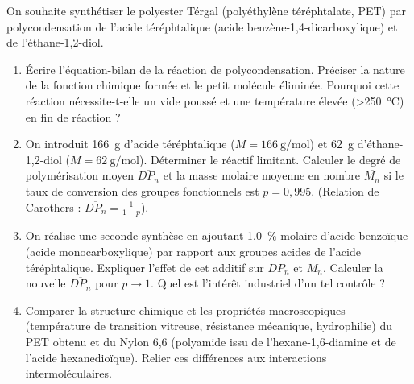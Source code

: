 \documentclass[11pt]{article}
\begin{document}
\begin{exercice}
On souhaite synthétiser le polyester Térgal (polyéthylène téréphtalate, PET) par polycondensation de l'acide téréphtalique (acide benzène-1,4-dicarboxylique) et de l'éthane-1,2-diol.
\begin{enumerate}
    \item Écrire l'équation-bilan de la réaction de polycondensation. Préciser la nature de la fonction chimique formée et le petit molécule éliminée. Pourquoi cette réaction nécessite-t-elle un vide poussé et une température élevée (\SI{>250}{\celsius}) en fin de réaction ?
    \item On introduit \SI{166}{\g} d'acide téréphtalique ($M=\SI{166}{\g\per\mol}$) et \SI{62}{\g} d'éthane-1,2-diol ($M=\SI{62}{\g\per\mol}$). Déterminer le réactif limitant. Calculer le degré de polymérisation moyen $\overline{DP_n}$ et la masse molaire moyenne en nombre $\overline{M_n}$ si le taux de conversion des groupes fonctionnels est $p = 0,995$. (Relation de Carothers : $\overline{DP_n} = \frac{1}{1-p}$).
    \item On réalise une seconde synthèse en ajoutant \SI{1,0}{\%} molaire d'acide benzoïque (acide monocarboxylique) par rapport aux groupes acides de l'acide téréphtalique. Expliquer l'effet de cet additif sur $\overline{DP_n}$ et $\overline{M_n}$. Calculer la nouvelle $\overline{DP_n}$ pour $p \to 1$. Quel est l'intérêt industriel d'un tel contrôle ?
    \item Comparer la structure chimique et les propriétés macroscopiques (température de transition vitreuse, résistance mécanique, hydrophilie) du PET obtenu et du Nylon 6,6 (polyamide issu de l'hexane-1,6-diamine et de l'acide hexanedioïque). Relier ces différences aux interactions intermoléculaires.
\end{enumerate}
\end{exercice}
\end{document}
